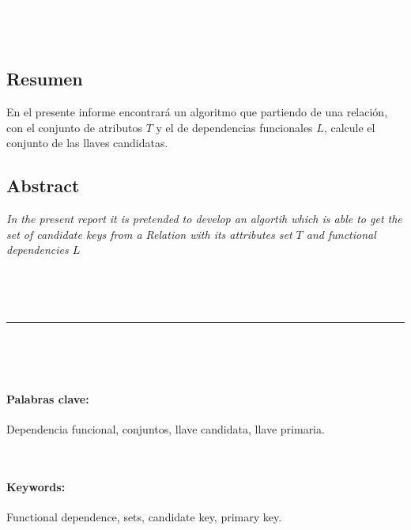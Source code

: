 \documentclass[a4paper,12pt]{article}
\newcommand{\vacio}{\textcolor{white}{holacaracola}}
\begin{document}

{%

\newpage

\renewcommand{\headrulewidth}{0.5pt}
\fancyhead[L]{\vacio}

\renewcommand{\footrulewidth}{0.5pt}
\fancyfoot[C]{}



\

\vacio

\


\subsection*{Resumen}
En el presente informe encontrará un algoritmo que partiendo de una relación, con el conjunto de atributos $T$ y el de dependencias funcionales $L$, calcule el conjunto de las llaves candidatas.


\subsection*{Abstract}
\textsl{
In the present report it is pretended to develop an algortih which is able to get the set of candidate keys from a Relation with its attributes set $T$ and functional dependencies $L$}

\ %

\

\hrule

\

\


\paragraph{Palabras clave:} Dependencia funcional, conjuntos, llave candidata, llave primaria.

\


\paragraph{Keywords:} Functional dependence, sets, candidate key, primary key.







}
\end{document}
